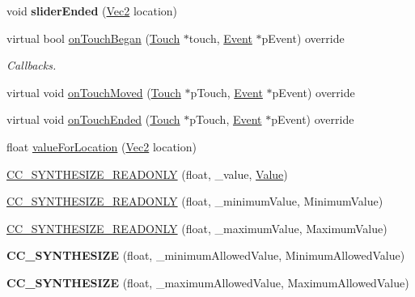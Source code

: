 \begin{DoxyCompactItemize}
\item 
\mbox{\label{classControlSlider_a20234c7f10be56751ffd842dd8fdcaa5}} 
void {\bfseries slider\+Ended} (\hyperlink{classVec2}{Vec2} location)
\item 
virtual bool \hyperlink{classControlSlider_a501e9da8ef3f1dacbfb9f7a12ecb2aed}{on\+Touch\+Began} (\hyperlink{classTouch}{Touch} $\ast$touch, \hyperlink{classEvent}{Event} $\ast$p\+Event) override
\begin{DoxyCompactList}\small\item\em Callbacks. \end{DoxyCompactList}\item 
virtual void \hyperlink{classControlSlider_ad7aab266125d50d61a0a58c00f44f94d}{on\+Touch\+Moved} (\hyperlink{classTouch}{Touch} $\ast$p\+Touch, \hyperlink{classEvent}{Event} $\ast$p\+Event) override
\item 
virtual void \hyperlink{classControlSlider_a9ba0559605c93e08dc4548261cbc2773}{on\+Touch\+Ended} (\hyperlink{classTouch}{Touch} $\ast$p\+Touch, \hyperlink{classEvent}{Event} $\ast$p\+Event) override
\item 
float \hyperlink{classControlSlider_a0b368f5f16a815ecdf027252ef3f88e6}{value\+For\+Location} (\hyperlink{classVec2}{Vec2} location)
\item 
\hyperlink{classControlSlider_a401fdf5a876cab98a1fdf9336ce27a17}{C\+C\+\_\+\+S\+Y\+N\+T\+H\+E\+S\+I\+Z\+E\+\_\+\+R\+E\+A\+D\+O\+N\+LY} (float, \+\_\+value, \hyperlink{classValue}{Value})
\item 
\hyperlink{classControlSlider_aad88e5f7129edc55c8417893d90386ec}{C\+C\+\_\+\+S\+Y\+N\+T\+H\+E\+S\+I\+Z\+E\+\_\+\+R\+E\+A\+D\+O\+N\+LY} (float, \+\_\+minimum\+Value, Minimum\+Value)
\item 
\hyperlink{classControlSlider_ac2c89169b57eaecd0f9b5a8d592d269b}{C\+C\+\_\+\+S\+Y\+N\+T\+H\+E\+S\+I\+Z\+E\+\_\+\+R\+E\+A\+D\+O\+N\+LY} (float, \+\_\+maximum\+Value, Maximum\+Value)
\item 
\mbox{\label{classControlSlider_a8f2bb847dc92e5d8609de9ba9f4af4c3}} 
{\bfseries C\+C\+\_\+\+S\+Y\+N\+T\+H\+E\+S\+I\+ZE} (float, \+\_\+minimum\+Allowed\+Value, Minimum\+Allowed\+Value)
\item 
\mbox{\label{classControlSlider_ad7b7f384fd2531e888f79335da9dfa7e}} 
{\bfseries C\+C\+\_\+\+S\+Y\+N\+T\+H\+E\+S\+I\+ZE} (float, \+\_\+maximum\+Allowed\+Value, Maximum\+Allowed\+Value)

\end{DoxyCompactItemize}
